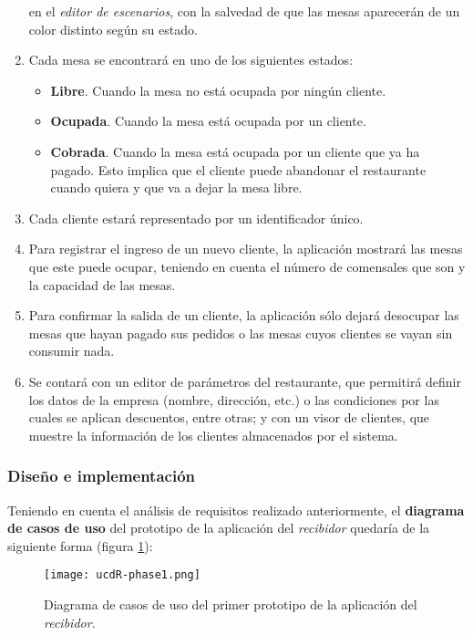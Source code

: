 \begin{enumerate}
en el \emph{editor de escenarios}, con la salvedad de que las mesas aparecerán
de un color distinto según su estado.
\item Cada mesa se encontrará en uno de los siguientes estados:
  \begin{itemize}
  \item \textbf{Libre}. Cuando la mesa no está ocupada por ningún cliente.
  \item \textbf{Ocupada}. Cuando la mesa está ocupada por un cliente.
  \item \textbf{Cobrada}. Cuando la mesa está ocupada por un cliente que ya
  ha pagado. Esto implica que el cliente puede abandonar el restaurante
  cuando quiera y que va a dejar la mesa libre.
  \end{itemize}
\item Cada cliente estará representado por un identificador único.
\item Para registrar el ingreso de un nuevo cliente, la aplicación mostrará
las mesas que este puede ocupar, teniendo en cuenta el número de comensales que
son y la capacidad de las mesas.
\item Para confirmar la salida de un cliente, la aplicación sólo dejará
desocupar las mesas que hayan pagado sus pedidos o las mesas cuyos clientes
se vayan sin consumir nada.
\item Se contará con un editor de parámetros del restaurante, que permitirá
definir los datos de la empresa (nombre, dirección, etc.) o las condiciones
por las cuales se aplican descuentos, entre otras; y con un visor de clientes,
que muestre la información de los clientes almacenados por el sistema.
\end{enumerate}
\newpage
\subsubsection{Diseño e implementación}
Teniendo en cuenta el análisis de requisitos realizado anteriormente, el
\textbf{diagrama de casos de uso} del prototipo de la aplicación del
\emph{recibidor} quedaría de la siguiente forma (figura \ref{fig:ucdR-phase1}):

  \begin{figure}[H]
    \begin{center}
      \texttt{[image: ucdR-phase1.png]}
      \caption{Diagrama de casos de uso del primer prototipo de la aplicación
      del \emph{recibidor}.}
      \label{fig:ucdR-phase1}
    \end{center}
  \end{figure}

